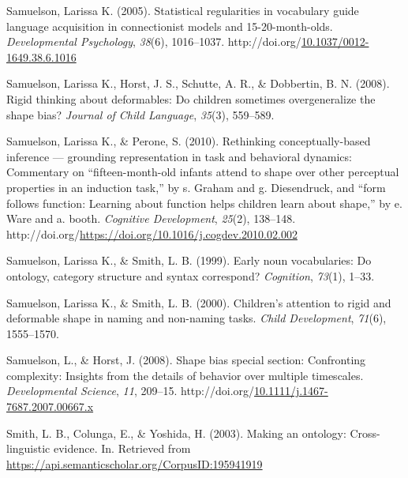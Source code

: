 \documentclass[10pt, letterpaper]{article}
\newenvironment{CSLReferences}%
  {}%
  {\par}
\begin{document}
\begin{CSLReferences}{1}{0}
\leavevmode{}%
Samuelson, Larissa K. (2005). Statistical regularities in vocabulary
guide language acquisition in connectionist models and 15-20-month-olds.
\emph{Developmental Psychology}, \emph{38}(6), 1016--1037.
http://doi.org/\href{https://doi.org/10.1037/0012-1649.38.6.1016}{10.1037/0012-1649.38.6.1016}

\leavevmode{}%
Samuelson, Larissa K., Horst, J. S., Schutte, A. R., \& Dobbertin, B. N.
(2008). Rigid thinking about deformables: Do children sometimes
overgeneralize the shape bias? \emph{Journal of Child Language},
\emph{35}(3), 559--589.

\leavevmode{}%
Samuelson, Larissa K., \& Perone, S. (2010). Rethinking
conceptually-based inference --- grounding representation in task and
behavioral dynamics: Commentary on {``fifteen-month-old infants attend
to shape over other perceptual properties in an induction task,''} by s.
Graham and g. Diesendruck, and {``form follows function: Learning about
function helps children learn about shape,''} by e. Ware and a. booth.
\emph{Cognitive Development}, \emph{25}(2), 138--148.
http://doi.org/\url{https://doi.org/10.1016/j.cogdev.2010.02.002}

\leavevmode{}%
Samuelson, Larissa K., \& Smith, L. B. (1999). Early noun vocabularies:
Do ontology, category structure and syntax correspond? \emph{Cognition},
\emph{73}(1), 1--33.

\leavevmode{}%
Samuelson, Larissa K., \& Smith, L. B. (2000). Children's attention to
rigid and deformable shape in naming and non-naming tasks. \emph{Child
Development}, \emph{71}(6), 1555--1570.

\leavevmode{}%
Samuelson, L., \& Horst, J. (2008). Shape bias special section:
Confronting complexity: Insights from the details of behavior over
multiple timescales. \emph{Developmental Science}, \emph{11}, 209--15.
http://doi.org/\href{https://doi.org/10.1111/j.1467-7687.2007.00667.x}{10.1111/j.1467-7687.2007.00667.x}

\leavevmode{}%
Smith, L. B., Colunga, E., \& Yoshida, H. (2003). Making an ontology:
Cross-linguistic evidence. In. Retrieved from
\url{https://api.semanticscholar.org/CorpusID:195941919}


\end{CSLReferences}
\end{document}

